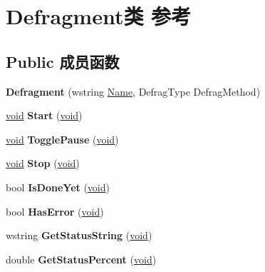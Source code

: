 \hypertarget{class_defragment}{}\section{Defragment类 参考}
\label{class_defragment}
\subsection*{Public 成员函数}
\begin{DoxyCompactItemize}
\item 
\mbox{\label{class_defragment_ab4fb1b4476f1218c063ac22db3d9e0cb}} 
{\bfseries Defragment} (wstring \hyperlink{struct_name_rec__}{Name}, Defrag\+Type Defrag\+Method)
\item 
\mbox{\label{class_defragment_a7967c4e84b770c0e68e1a8c160287138}} 
\hyperlink{interfacevoid}{void} {\bfseries Start} (\hyperlink{interfacevoid}{void})
\item 
\mbox{\label{class_defragment_a08d4da59dc036a44ff3f7a0abc71c3ab}} 
\hyperlink{interfacevoid}{void} {\bfseries Toggle\+Pause} (\hyperlink{interfacevoid}{void})
\item 
\mbox{\label{class_defragment_ab319da97d6dec84bf4d543a1201dc794}} 
\hyperlink{interfacevoid}{void} {\bfseries Stop} (\hyperlink{interfacevoid}{void})
\item 
\mbox{\label{class_defragment_a51dd3e89a0137f205117f5ba7a680dcc}} 
bool {\bfseries Is\+Done\+Yet} (\hyperlink{interfacevoid}{void})
\item 
\mbox{\label{class_defragment_ae528b3c7a684e1ae35dc146ab4825039}} 
bool {\bfseries Has\+Error} (\hyperlink{interfacevoid}{void})
\item 
\mbox{\label{class_defragment_aaff128f8dbc125d995deb12411d71572}} 
wstring {\bfseries Get\+Status\+String} (\hyperlink{interfacevoid}{void})
\item 
\mbox{\label{class_defragment_aec4fd9f9f8e3cd6282aee49d31c5c7ab}} 
double {\bfseries Get\+Status\+Percent} (\hyperlink{interfacevoid}{void})
\item 

\end{DoxyCompactItemize}
